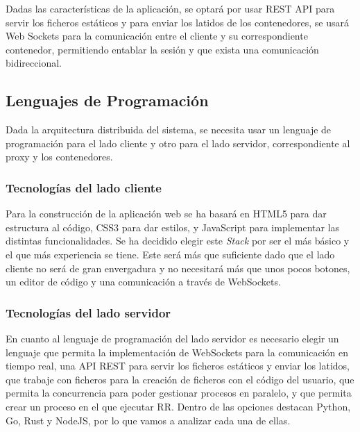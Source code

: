 Dadas las características de la aplicación, se optará por usar REST API para servir los ficheros estáticos y para enviar los latidos de los contenedores, se usará Web Sockets para la comunicación entre el cliente y su correspondiente contenedor, permitiendo entablar la sesión y que exista una comunicación bidireccional. 

\subsection{Lenguajes de Programación} \label{sec:programacion}

Dada la arquitectura distribuida del sistema, se necesita usar un lenguaje de programación para el lado cliente y otro para el lado servidor, correspondiente al proxy y los contenedores.

\subsubsection{Tecnologías del lado cliente} \label{subsubsec:tecnologias-cliente}

Para la construcción de la aplicación web se ha basará en HTML5 para dar estructura al código, CSS3 para dar estilos, y JavaScript para implementar las distintas funcionalidades. Se ha decidido elegir este \textit{Stack} por ser el más básico y el que más experiencia se tiene. Este  será más que suficiente dado que el lado cliente no será de gran envergadura y no necesitará más que unos pocos botones, un editor de código y una comunicación a través de WebSockets.


\subsubsection{Tecnologías del lado servidor} \label{sec:tecnologias-servidor}

En cuanto al lenguaje de programación del lado servidor es necesario elegir un lenguaje que permita la implementación de WebSockets para la comunicación en tiempo real, una API REST para servir los ficheros estáticos y enviar los latidos, que trabaje con ficheros para la creación de ficheros con el código del usuario, que permita la concurrencia para poder gestionar procesos en paralelo, y que permita crear un proceso en el que ejecutar RR.
Dentro de las opciones destacan Python, Go, Rust y NodeJS, por lo que vamos a analizar cada una de ellas.

